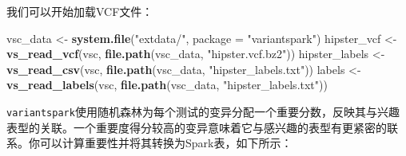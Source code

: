 \documentclass[
]{article}
\newenvironment{Shaded}{\begin{snugshade}}{\end{snugshade}}
\newcommand{\CommentTok}[1]{\textcolor[rgb]{0.56,0.35,0.01}{\textit{#1}}}
\newcommand{\DataTypeTok}[1]{\textcolor[rgb]{0.13,0.29,0.53}{#1}}
\newcommand{\DecValTok}[1]{\textcolor[rgb]{0.00,0.00,0.81}{#1}}
\newcommand{\ErrorTok}[1]{\textcolor[rgb]{0.64,0.00,0.00}{\textbf{#1}}}
\newcommand{\FloatTok}[1]{\textcolor[rgb]{0.00,0.00,0.81}{#1}}
\newcommand{\KeywordTok}[1]{\textcolor[rgb]{0.13,0.29,0.53}{\textbf{#1}}}
\newcommand{\NormalTok}[1]{#1}
\newcommand{\OperatorTok}[1]{\textcolor[rgb]{0.81,0.36,0.00}{\textbf{#1}}}
\newcommand{\StringTok}[1]{\textcolor[rgb]{0.31,0.60,0.02}{#1}}
\begin{document}
我们可以开始加载VCF文件：

\begin{Shaded}
\begin{Highlighting}[]
\NormalTok{vsc_data <-}\StringTok{ }\KeywordTok{system.file}\NormalTok{(}\StringTok{"extdata/"}\NormalTok{, }\DataTypeTok{package =} \StringTok{"variantspark"}\NormalTok{)}
\NormalTok{hipster_vcf <-}\StringTok{ }\KeywordTok{vs_read_vcf}\NormalTok{(vsc, }\KeywordTok{file.path}\NormalTok{(vsc_data, }\StringTok{"hipster.vcf.bz2"}\NormalTok{))}
\NormalTok{hipster_labels <-}\StringTok{ }\KeywordTok{vs_read_csv}\NormalTok{(vsc, }\KeywordTok{file.path}\NormalTok{(vsc_data, }\StringTok{"hipster_labels.txt"}\NormalTok{))}
\NormalTok{labels <-}\StringTok{ }\KeywordTok{vs_read_labels}\NormalTok{(vsc, }\KeywordTok{file.path}\NormalTok{(vsc_data, }\StringTok{"hipster_labels.txt"}\NormalTok{))}
\end{Highlighting}
\end{Shaded}

\texttt{variantspark}使用随机森林为每个测试的变异分配一个重要分数，反映其与兴趣表型的关联。一个重要度得分较高的变异意味着它与感兴趣的表型有更紧密的联系。你可以计算重要性并将其转换为Spark表，如下所示：

\begin{Shaded}
\end{Shaded}
\end{document}
